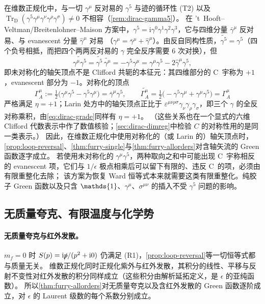 \documentclass[UTF8,a4paper,11pt,fontset=fandol]{ctexart}
\let\amsmathbb\mathbb
\renewcommand{\mathbb}[1]{\ifx1#1\mathds{1}\else\amsmathbb{#1}\fi}
\theoremstyle{cplain}
\theoremstyle{cdefinition}
\theoremstyle{cremark}
\numberwithin{equation}{section}
\newcommand{\TrD}{\operatorname{Tr}_{\mathrm{D}}}   %
\newcommand{\sla}[1]{\slashed{#1}}                  %
\newcommand{\ii}{\mathrm{i}}                        %
\newcommand{\Cconj}[1]{\widetilde{#1}}              %
\begin{document}
在维数正规化中，与一切 $\gamma^\mu$ 反对易的 $\gamma^5$ 与迹的循环性 (T2) 以及 $\TrD(\gamma^5\gamma^\mu\gamma^\nu\gamma^\rho\gamma^\sigma)\neq0$ 不相容（\cref{rem:dirac-gamma5}）。
在 \mbox{'t}~Hooft--Veltman/Breitenlohner--Maison 方案\cite{BreitenlohnerMaison1977,tHooftVeltman1972}中，$\gamma^5=\ii\gamma^0\gamma^1\gamma^2\gamma^3$，它与四维分量 $\bar\gamma^\mu$ 反对易、与 evanescent 分量 $\hat\gamma^\mu$ 对易
（$\gamma^\mu=\bar\gamma^\mu+\hat\gamma^\mu$）。由反自同构性质，$\Cconj{\gamma^5}=\gamma^5$（四个负号相抵，而把四个两两反对易的 $\gamma$ 完全反序需要 $6$ 次对换），但
\begin{equation}\label{eq:reg-bmhv}
\Cconj{\gamma^\mu\gamma^5}=\Cconj{\gamma^5}\,\Cconj{\gamma^\mu}=-\gamma^5\gamma^\mu=\gamma^\mu\gamma^5-2\hat\gamma^\mu\gamma^5 ,
\end{equation}
即未对称化的轴矢顶点不是 Clifford 共轭的本征元：其四维部分的 C~宇称为 $+1$，evanescent 部分为 $-1$。对称化的顶点
\begin{equation}\label{eq:reg-axial}
\Gamma^\mu_A:=\tfrac12\bigl(\gamma^\mu\gamma^5-\gamma^5\gamma^\mu\bigr)=\bar\gamma^\mu\gamma^5,\qquad
\Cconj{\Gamma^\mu_A}=\tfrac12\bigl(-\gamma^5\gamma^\mu+\gamma^\mu\gamma^5\bigr)=\Gamma^\mu_A
\end{equation}
严格满足 $\eta=+1$；Larin 处方\cite{Larin1993}中的轴矢顶点正比于 $\varepsilon^{\mu\nu\rho\sigma}\gamma_\nu\gamma_\rho\gamma_\sigma$，即三个 $\gamma$ 的全反对称乘积，由\cref{eq:dirac-grade}同样有 $\eta=+1$。
（这些关系也在一个显式的六维 Clifford 代数表示中作了数值核验；\cref{sec:dirac-dimreg}中检验 $C$ 的对称性用的是同一类表示。）
因此，在维数正规化中使用对称化的（或 Larin 的）轴矢顶点时，\cref{prop:loop-reversal}、\cref{thm:furry-single}与\cref{thm:furry-allorders}对含轴矢流的 Green 函数逐字成立。
若使用未对称化的 $\gamma^\mu\gamma^5$，两种取向之和中可能出现 C~宇称相反的 evanescent 项，它们与 $1/\epsilon$ 极点相乘后可以留下有限的、违反 C~的项，必须由有限重整化去除；
该方案为恢复 Ward 恒等式本来就需要这类有限重整化\cite{Larin1993}。纯胶子 Green 函数以及只含 $\mathbb 1$、$\gamma^\mu$、$\sigma^{\mu\nu}$ 的插入不受 $\gamma^5$ 问题的影响。

\subsection{无质量夸克、有限温度与化学势}\label{sec:reg-ir-thermal}

\paragraph{无质量夸克与红外发散。}$m_f=0$ 时 $S(p)=\ii\sla p/(p^2+\ii0)$ 仍满足 (R1)，\cref{prop:loop-reversal}等一切恒等式都与质量无关。
维数正规化同时正规化紫外与红外发散，其积分的线性、平移与反射不变性对红外发散的积分同样成立（这些积分由解析延拓定义，是 $\epsilon$ 的亚纯函数）。
所以\cref{thm:furry-allorders}对无质量夸克以及含红外发散的 Green 函数逐阶成立，对 $\epsilon$ 的 Laurent 级数的每个系数分别成立。
\end{document}
